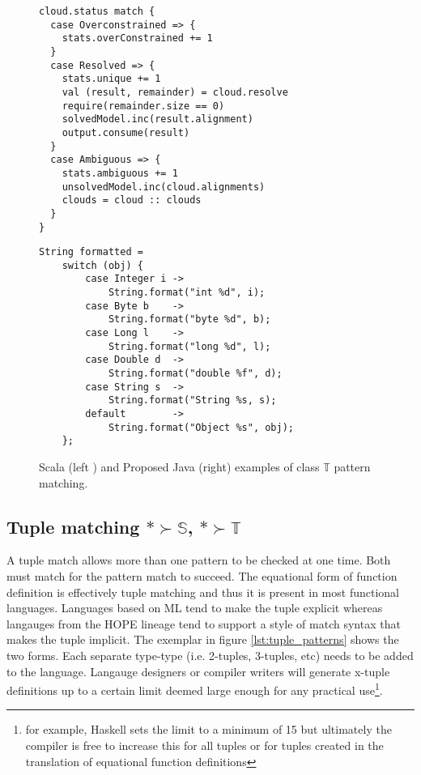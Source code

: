 \documentclass[acmsmall]{acmart}
\begin{document}
\begin{figure}
\hspace{-4em}
\begin{minipage}[t]{0.45\linewidth}
\begin{lstlisting}[basicstyle=\small\ttfamily]
cloud.status match {
  case Overconstrained => {
    stats.overConstrained += 1
  }
  case Resolved => {
    stats.unique += 1
    val (result, remainder) = cloud.resolve
    require(remainder.size == 0)
    solvedModel.inc(result.alignment)
    output.consume(result)
  }
  case Ambiguous => {
    stats.ambiguous += 1
    unsolvedModel.inc(cloud.alignments)
    clouds = cloud :: clouds
  }
}
\end{lstlisting}
\end{minipage}
\hspace{2em}
\begin{minipage}[t]{0.45\linewidth}
\begin{lstlisting}[basicstyle=\small\ttfamily]
String formatted =
    switch (obj) {
        case Integer i -> 
            String.format("int %d", i); 
        case Byte b    -> 
            String.format("byte %d", b); 
        case Long l    -> 
            String.format("long %d", l); 
        case Double d  -> 
            String.format("double %f", d); 
        case String s  -> 
            String.format("String %s, s);
        default        -> 
            String.format("Object %s", obj);
    };
\end{lstlisting}
\end{minipage}
\caption{Scala (left \cite{larsyencken10}) and Proposed Java (right) examples of class $\mathbb{T}$ pattern matching.}
\label{lst:wild_t}
\end{figure}

\subsection{Tuple matching $\mathbb{*} \succ \mathbb{S}$, $\mathbb{*} \succ \mathbb{T}$}

A tuple match allows more than one pattern to be checked at one time.  Both must match for the pattern match to succeed.  The equational form of function definition is effectively tuple matching and thus it is present in most functional languages.  Languages based on ML tend to make the tuple explicit whereas langauges from the HOPE lineage tend to support a style of match syntax that makes the tuple implicit.  The exemplar in figure \ref{lst:tuple_patterns} shows the two forms.  Each separate type-type (i.e. 2-tuples, 3-tuples, etc) needs to be added to the language.  Langauge designers or compiler writers will generate x-tuple definitions up to a certain limit deemed large enough for any practical use\footnote{for example, Haskell sets the limit to a minimum of 15 but ultimately the compiler is free to increase this for all tuples or for tuples created in the translation of equational function definitions}.
\end{document}
